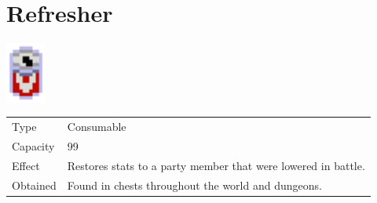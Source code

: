 \section{Refresher}
\label{item:refresher}

\includegraphics[height=2cm,keepaspectratio]{./resources/items/refresher}

\begin{longtable}{ l p{9cm} }
	Type
	& Consumable
\\ %
	Capacity
	& 99
\\ %
	Effect
	& Restores stats to a party member that were lowered in battle.
\\ %
	Obtained
	& Found in chests throughout the world and dungeons.
\end{longtable}
